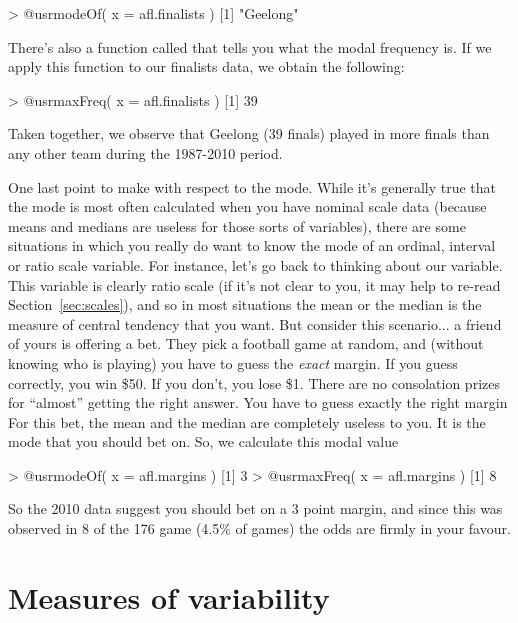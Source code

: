 \begin{rblock1}
> @usr{modeOf( x = afl.finalists )}
[1] "Geelong"
\end{rblock1}
There's also a function called  that tells you what the modal frequency is. If we apply this function to our finalists data, we obtain the following:
\begin{rblock1}
> @usr{maxFreq( x = afl.finalists )}
[1] 39
\end{rblock1}
Taken together, we observe that Geelong (39 finals) played in more finals than any other team during the 1987-2010 period. 

One last point to make with respect to the mode. While it's generally true that the mode is most often calculated when you have nominal scale data (because means and medians are useless for those sorts of variables), there are some situations in which you really do want to know the mode of an ordinal, interval or ratio scale variable. For instance, let's go back to thinking about our  variable. This variable is clearly ratio scale (if it's not clear to you, it may help to re-read Section~\ref{sec:scales}), and so in most situations the mean or the median is the measure of central tendency that you want. But consider this scenario... a friend of yours is offering a bet. They pick a football game at random, and (without knowing who is playing) you have to guess the {\it exact} margin. If you guess correctly, you win \$50. If you don't, you lose \$1. There are no consolation prizes for ``almost'' getting the right answer. You have to guess exactly the right margin For this bet, the mean and the median are completely useless to you. It is the mode that you should bet on. So, we calculate this modal value
\begin{rblock1}
> @usr{modeOf( x = afl.margins )}
[1] 3
> @usr{maxFreq( x = afl.margins )}
[1] 8
\end{rblock1}	
So the 2010 data suggest you should bet on a 3 point margin, and since this was observed in 8 of the 176 game (4.5\% of games) the odds are firmly in your favour. 










\section{Measures of variability\label{sec:var}}

